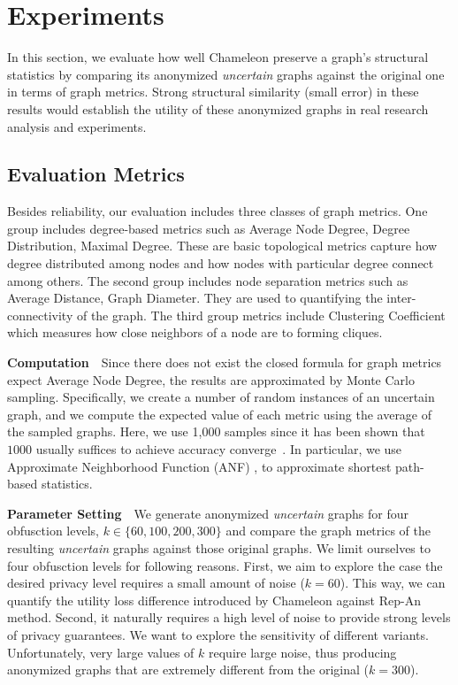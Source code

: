 \section{Experiments}
\label{sec:exp}
In this section, we evaluate how well Chameleon preserve a graph's structural statistics by comparing its anonymized \emph{uncertain} graphs against the original one in terms of graph metrics. Strong structural similarity (small error) in these results would establish the utility of these anonymized graphs in real research analysis and experiments. 

\subsection{Evaluation Metrics}
Besides reliability, our evaluation includes three classes of graph metrics. 
One group includes degree-based metrics such as Average Node Degree, Degree Distribution, Maximal Degree. These are basic topological metrics capture how degree distributed among nodes and how nodes with particular degree connect among others. The second group includes node separation metrics such as Average Distance, Graph Diameter. They are used to quantifying the inter-connectivity of the graph. The third group metrics include Clustering Coefficient which measures how close neighbors of a node are to forming cliques.

\textbf{Computation}~~Since there does not exist the closed formula for graph metrics expect Average Node Degree, the results are approximated by Monte Carlo sampling. Specifically, we create a number of random instances of an  uncertain graph, and we compute the expected value of each metric using the average of the sampled graphs. Here, we use 1,000 samples since it has been shown that $1000$ usually suffices to achieve accuracy converge~\cite{Potamias_K_2010,Jin_Distance_2011}. In particular, we use Approximate Neighborhood Function (ANF) \cite{Boldi_Rosa_Vigna_2011}, to approximate shortest path-based statistics. 

\textbf{Parameter Setting}~~We generate anonymized \emph{uncertain} graphs for four obfusction levels, $k \in \lbrace 60,100,200,300\rbrace$ and compare the graph metrics of the resulting \emph{uncertain} graphs against those original graphs. We limit ourselves to four obfusction levels for following reasons. 
First, we aim to explore the case the desired privacy level requires a small amount of noise ($k=60$). This way, we can quantify the utility loss difference introduced by Chameleon against Rep-An method. Second, it naturally requires a high level of noise to provide strong levels of privacy guarantees. We want to explore the sensitivity of different variants. Unfortunately, very large values of $k$ require large noise, thus producing anonymized graphs that are extremely different from the original ($k=300$). 


